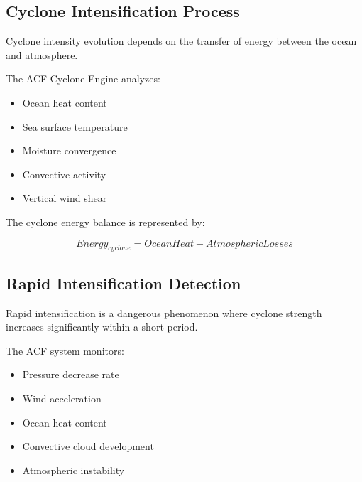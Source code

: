 \subsection{Cyclone Intensification Process}

Cyclone intensity evolution depends on the transfer of energy between
the ocean and atmosphere.

The ACF Cyclone Engine analyzes:

\begin{itemize}

\item Ocean heat content

\item Sea surface temperature

\item Moisture convergence

\item Convective activity

\item Vertical wind shear

\end{itemize}


The cyclone energy balance is represented by:

\[
Energy_{cyclone}
=
OceanHeat
-
AtmosphericLosses
\]



\subsection{Rapid Intensification Detection}

Rapid intensification is a dangerous phenomenon where cyclone strength
increases significantly within a short period.

The ACF system monitors:

\begin{itemize}

\item Pressure decrease rate

\item Wind acceleration

\item Ocean heat content

\item Convective cloud development

\item Atmospheric instability

\end{itemize}


